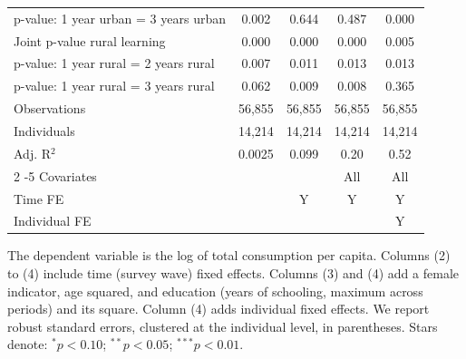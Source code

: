 \begin{table}[htbp]
\begin{threeparttable}
\begin{tabular}{l cccc}
p-value: 1 year urban = 3 years urban&       0.002   &       0.644   &       0.487   &       0.000   \\
Joint p-value rural learning&       0.000   &       0.000   &       0.000   &       0.005   \\
p-value: 1 year rural = 2 years rural&       0.007   &       0.011   &       0.013   &       0.013   \\
p-value: 1 year rural = 3 years rural&       0.062   &       0.009   &       0.008   &       0.365   \\
Observations        &      56,855   &      56,855   &      56,855   &      56,855   \\
Individuals         &      14,214   &      14,214   &      14,214   &      14,214   \\
Adj. R$^{2}$        &      0.0025   &       0.099   &        0.20   &        0.52   \\
\cmidrule{2 -5} Covariates & & & All & All \\ Time FE & & Y & Y & Y \\ Individual FE & & & & Y \\ \bottomrule \end{tabular} \begin{tablenotes}[flushleft] \footnotesize \item{The dependent variable is the log of total consumption per capita. Columns (2) to (4) include time (survey wave) fixed effects. Columns (3) and (4) add a female indicator, age squared, and education (years of schooling, maximum across periods) and its square. Column (4) adds individual fixed effects. We report robust standard errors, clustered at the individual level, in parentheses. Stars denote: $^{*} p<0.10$; $^{**} p<0.05$; $^{***} p<0.01$.} \end{tablenotes} \end{threeparttable} \end{table}
